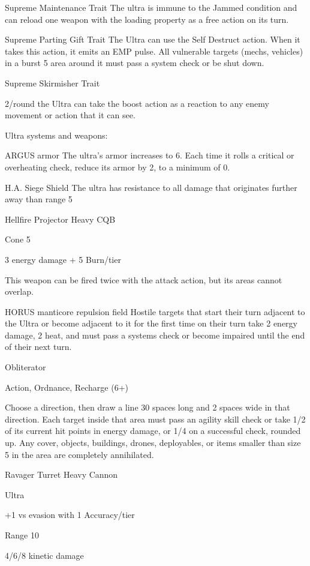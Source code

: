 Supreme Maintenance
Trait
The ultra is immune to the Jammed condition and can reload one weapon with the loading
property as a free action on its turn.


Supreme Parting Gift
Trait
The Ultra can use the Self Destruct action. When it takes this action, it emits an EMP pulse. All
vulnerable targets (mechs, vehicles) in a burst 5 area around it must pass a system check or be
shut down.


Supreme Skirmisher
Trait

2/round the Ultra can take the boost action as a reaction to any enemy movement or action that
it can see.


Ultra systems and weapons:

ARGUS armor
The ultra’s armor increases to 6. Each time it rolls a critical or overheating check, reduce its
armor by 2, to a minimum of 0.


H.A. Siege Shield
The ultra has resistance to all damage that originates further away than range 5


Hellfire Projector
Heavy CQB

Cone 5

3 energy damage + 5 Burn/tier

This weapon can be fired twice with the attack action, but its areas cannot overlap.





HORUS manticore repulsion field
Hostile targets that start their turn adjacent to the Ultra or become adjacent to it for the first time
on their turn take 2 energy damage, 2 heat, and must pass a systems check or become impaired
until the end of their next turn.


Obliterator

Action, Ordnance, Recharge (6+)

Choose a direction, then draw a line 30 spaces long and 2 spaces wide in that direction. Each
target inside that area must pass an agility skill check or take 1/2 of its current hit points in energy
damage, or 1/4 on a successful check, rounded up. Any cover, objects, buildings, drones,
deployables, or items smaller than size 5 in the area are completely annihilated.


Ravager Turret
Heavy Cannon

Ultra

+1 vs evasion with 1 Accuracy/tier

Range 10

4/6/8 kinetic damage

